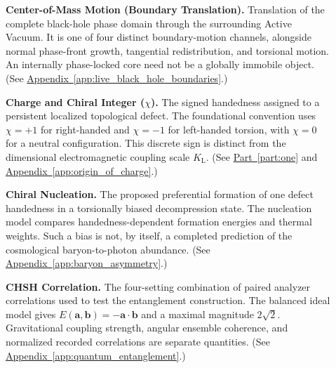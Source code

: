 \begin{description}
\item[] \begin{minipage}[t]{\linewidth}
\textbf{Center-of-Mass Motion (Boundary Translation).} Translation of the complete black-hole phase domain through the surrounding Active Vacuum. It is one of four distinct boundary-motion channels, alongside normal phase-front growth, tangential redistribution, and torsional motion. An internally phase-locked core need not be a globally immobile object.
(See \hyperref[app:live_black_hole_boundaries]{Appendix~\ref*{app:live_black_hole_boundaries}}.)
\end{minipage}

\item[] \begin{minipage}[t]{\linewidth}
\textbf{Charge and Chiral Integer ($\chi$).} The signed handedness assigned to a persistent localized topological defect. The foundational convention uses $\chi=+1$ for right-handed and $\chi=-1$ for left-handed torsion, with $\chi=0$ for a neutral configuration. This discrete sign is distinct from the dimensional electromagnetic coupling scale $K_{\mathrm L}$.
(See \hyperref[part:one]{Part~\ref*{part:one}} and \hyperref[app:origin_of_charge]{Appendix~\ref*{app:origin_of_charge}}.)
\end{minipage}

\item[] \begin{minipage}[t]{\linewidth}
\textbf{Chiral Nucleation.} The proposed preferential formation of one defect handedness in a torsionally biased decompression state. The nucleation model compares handedness-dependent formation energies and thermal weights. Such a bias is not, by itself, a completed prediction of the cosmological baryon-to-photon abundance.
(See \hyperref[app:baryon_asymmetry]{Appendix~\ref*{app:baryon_asymmetry}}.)
\end{minipage}

\item[] \begin{minipage}[t]{\linewidth}
\textbf{CHSH Correlation.} The four-setting combination of paired analyzer correlations used to test the entanglement construction. The balanced ideal model gives $E(\mathbf a,\mathbf b)=-\mathbf a\cdot\mathbf b$ and a maximal magnitude $2\sqrt{2}$. Gravitational coupling strength, angular ensemble coherence, and normalized recorded correlations are separate quantities.
(See \hyperref[app:quantum_entanglement]{Appendix~\ref*{app:quantum_entanglement}}.)
\end{minipage}


\end{description}
